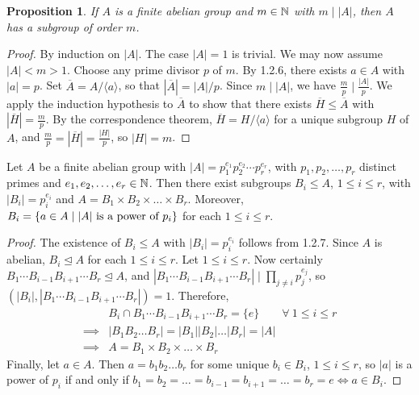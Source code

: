 \documentclass[11pt]{book}
\newcounter{counter}
\newtheorem{proposition}[counter]{Proposition}   \newtheorem{problem}[counter]{Problem}   \newtheorem*{proposition*}{Proposition}   \newtheorem*{lemma*}{Lemma}
\theoremstyle{definition}   \newtheorem{defn}[counter]{Definition} %
\newcommand{\ov}{\overline}   \newcommand{\wt}{\widetilde}
\newcommand{\nsg}{\mathrel{\unlhd}}   \newcommand{\ind}{\parindent24pt}   \newcommand{\vn}{\varnothing}
\newcommand{\pf}[1]{$ #1 = p_1^{e_1} p_2^{e_2} \cdots p_r^{e_r}$, with $p_1,p_2,\dots,p_r$ distinct primes and $e_1,e_2,\dots,e_r\in \N$}
\newcommand{\gen}[1]{\langle #1 \rangle}   \newcommand{\stab}[2]{\tn{Stab}_{#1}(#2)}   \newcommand{\fix}[2]{\tn{Fix}_{#1}(#2)}
\newcommand{\vs}{\vspace{8pt}}
\numberwithin{counter}{chapter}
\begin{document}
\begin{proposition}
If $A$ is a finite abelian group and $m \in \operatorname{\mathbb{N}}$ with $m \mid |A|$, then $A$ has a subgroup of order $m$.
\end{proposition}

\begin{proof}
By induction on $|A|$. The case $|A| = 1$ is trivial. We may now assume $|A| < m > 1$. Choose any prime divisor $p$ of $m$. By 1.2.6, there exists $a \in A$ with $|a| = p$. Set $\ov{A} = A / \gen{a}$, so that $|\ov{A}| = |A|/p$. Since $m \mid |A|$, we have $\frac{m}{p} \mid \frac{|A|}{p}$. We apply the induction hypothesis to $\ov{A}$ to show that there exists $\ov{H} \leq \ov{A}$ with $|\ov{H}| = \frac{m}{p}$. By the correspondence theorem, $\ov{H} = H/\gen{a}$ for a unique subgroup $H$ of $A$, and $\frac{m}{p} = |\ov{H}| = \frac{|H|}{p}$, so $|H| = m$.
\end{proof}

\vs

\begin{corollary}
Let $A$ be a finite abelian group with \pf{|A|}. Then there exist subgroups $B_i \leq A$, $1 \leq i \leq r$, with $|B_i| = p_i^{e_i}$ and $A = B_1 \times B_2 \times \dots \times B_r$. Moreover, $B_i = \{a \in A \mid |A| \textnormal{ is a power of } p_i\}$ for each $1 \leq i \leq r$.
\end{corollary}

\begin{proof}
The existence of $B_i \leq A$ with $|B_i| = p_i^{e_i}$ follows from 1.2.7. Since $A$ is abelian, $B_i \nsg A$ for each $1 \leq i \leq r$. Let $1 \leq i \leq r$. Now certainly $B_1 \cdots B_{i-1} B_{i+1} \cdots B_r \nsg A$, and $|B_1 \cdots B_{i-1} B_{i+1} \cdots B_r| \mid \prod_{j\ne i} p_j^{e_j}$, so $(|B_i|,|B_1 \cdots B_{i-1} B_{i+1} \cdots B_r|) = 1$. Therefore,
	\begin{align*}
	&B_i \cap B_1 \cdots B_{i-1} B_{i+1} \cdots B_r = \{e\} \qquad \forall \ 1 \leq i \leq r \\
	\implies & |B_1 B_2 \dots B_r| = |B_1| |B_2| \dots |B_r| = |A| \\
	\implies &A = B_1 \times B_2 \times \dots \times B_r
	\end{align*}
Finally, let $a \in A$. Then $a = b_1 b_2 \dots b_r$ for some unique $b_i \in B_i$, $1 \leq i \leq r$, so $|a|$ is a power of $p_i$ if and only if $b_1 = b_2 = \dots = b_{i-1} = b_{i+1} = \dots = b_r = e \iff a \in B_i$.
\end{proof}

\vs
\end{document}
